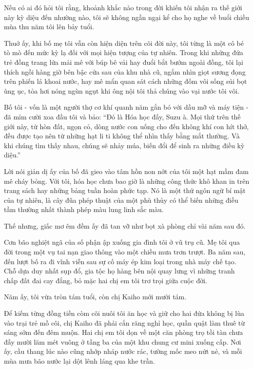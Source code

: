 \documentclass[../main.tex]{subfiles}
\begin{document}

Nếu có ai đó hỏi tôi rằng, khoảnh khắc nào trong đời khiến tôi nhận ra thế giới này kỳ diệu đến nhường nào, tôi sẽ không ngần ngại kể cho họ nghe về buổi chiều mùa thu năm tôi lên bảy tuổi.

Thuở ấy, khi bố mẹ tôi vẫn còn hiện diện trên cõi đời này, tôi từng là một cô bé tò mò đến mức kỳ lạ đối với mọi hiện tượng của tự nhiên. Trong khi những đứa trẻ đồng trang lứa mải mê với búp bê vải hay đuổi bắt bướm ngoài đồng, tôi lại thích ngồi hàng giờ bên bậc cửa sau của khu nhà cũ, ngắm nhìn giọt sương đọng trên phiến lá khoai nước, hay mê mẩn quan sát cách những đốm vôi sống sủi bọt ùng ục, tỏa hơi nóng ngùn ngụt khi ông nội tôi thả chúng vào vại nước tôi vôi.

Bố tôi - vốn là một người thợ cơ khí quanh năm gắn bó với dầu mỡ và máy tiện - đã mỉm cười xoa đầu tôi và bảo: ``Đó là Hóa học đấy, Suzu à. Mọi thứ trên thế giới này, từ hòn đất, ngọn cỏ, dòng nước con uống cho đến không khí con hít thở, đều được tạo nên từ những hạt li ti không thể nhìn thấy bằng mắt thường. Và khi chúng tìm thấy nhau, chúng sẽ nhảy múa, biến đổi để sinh ra những điều kỳ diệu.''

Lời nói giản dị ấy của bố đã gieo vào tâm hồn non nớt của tôi một hạt mầm đam mê cháy bỏng. Với tôi, hóa học chưa bao giờ là những công thức khô khan in trên trang sách hay những bảng tuần hoàn phức tạp. Nó là một thứ ngôn ngữ bí mật của tự nhiên, là cây đũa phép thuật của một phù thủy có thể biến những điều tầm thường nhất thành phép màu lung linh sắc màu.

Thế nhưng, giấc mơ êm đềm ấy đã tan vỡ như bọt xà phòng chỉ vài năm sau đó.

Cơn bão nghiệt ngã của số phận ập xuống gia đình tôi ở vũ trụ cũ. Mẹ tôi qua đời trong một vụ tai nạn giao thông vào một chiều mưa trơn trượt. Ba năm sau, đến lượt bố ra đi vĩnh viễn sau sự cố máy ép kim loại trong nhà máy chế tạo. Chỗ dựa duy nhất sụp đổ, gia tộc họ hàng bên nội quay lưng vì những tranh chấp đất đai cay đắng, bỏ mặc hai chị em tôi trơ trọi giữa cuộc đời.

Năm ấy, tôi vừa tròn tám tuổi, còn chị Kaiho mới mười tám.

Để kiếm từng đồng tiền còm cõi nuôi tôi ăn học và giữ cho hai đứa không bị lùa vào trại trẻ mồ côi, chị Kaiho đã phải cắn răng nghỉ học, quần quật làm thuê từ sáng sớm đến đêm muộn. Hai chị em tôi dọn về một căn phòng trọ tồi tàn chưa đầy mười lăm mét vuông ở tầng ba của một khu chung cư mini xuống cấp. Nơi ấy, cầu thang lúc nào cũng nhớp nháp nước rác, tường mốc meo nứt nẻ, và mỗi mùa mưa bão nước lại dột lênh láng qua khe trần.
\end{document}
